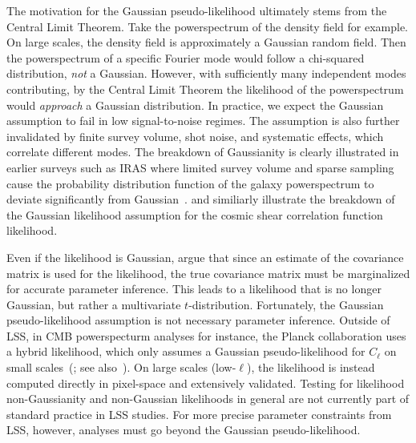 \documentclass[12pt, letterpaper, preprint]{aastex}
\begin{document}
The motivation for the Gaussian pseudo-likelihood ultimately stems 
from the Central Limit Theorem. Take the powerspectrum of the density 
field for example. On large scales, the density field is approximately a 
Gaussian random field. Then the powerspectrum of a specific Fourier 
mode would follow a chi-squared distribution, \emph{not} a Gaussian. 
However, with sufficiently many independent modes contributing, by the Central 
Limit Theorem the likelihood of the powerspectrum would \emph{approach} a 
Gaussian distribution. In practice, we expect the Gaussian assumption 
to fail in low signal-to-noise regimes. The assumption is also further invalidated 
by finite survey volume, shot noise, and systematic effects, which correlate
different modes. The breakdown of Gaussianity is clearly illustrated in earlier 
surveys such as IRAS where limited survey volume and sparse sampling cause the 
probability distribution function of the galaxy powerspectrum to deviate 
significantly from Gaussian~\citep[see Figure 9 in][]{scoccimarro2000}. 
\cite{hartlap2009} and \cite{sellentin2017} similiarly illustrate the breakdown
of the Gaussian likelihood assumption for the cosmic shear correlation function 
likelihood.

Even if the likelihood is Gaussian, \cite{sellentin2016} argue that 
since an estimate of the covariance matrix is used for the likelihood, 
the true covariance matrix must be marginalized for accurate parameter 
inference. This leads to a likelihood that is no longer Gaussian, but rather a 
multivariate $t$-distribution. Fortunately, the Gaussian pseudo-likelihood 
assumption is not necessary parameter inference. Outside of LSS, in CMB 
powerspecturm analyses for instance, the Planck collaboration 
uses a hybrid likelihood, which only assumes a Gaussian pseudo-likelihood 
for $C_\ell$ on small scales~(\citealt{ade2014,aghanim2016}; see 
also~\citealt{efstathiou2004, efstathiou2006}). On large scales (low-$\ell$), 
the likelihood is instead computed directly in pixel-space and extensively 
validated. Testing for likelihood non-Gaussianity and non-Gaussian likelihoods 
in general are not currently part of standard practice in LSS studies. For 
more precise parameter constraints from LSS, however, analyses must go beyond the 
Gaussian pseudo-likelihood.
\end{document}

